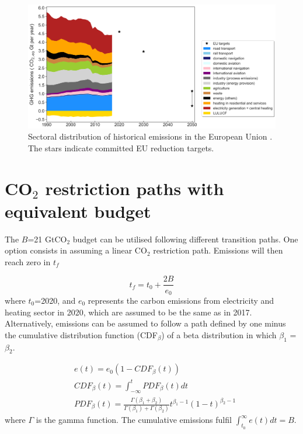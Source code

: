 \documentclass[3p]{elsarticle} %
\begin{document}
\begin{figure}[!h]
\centering
\includegraphics[width=\textwidth]{figures/historical_sectoral_emissions.png}
\caption{Sectoral distribution of historical emissions in the European Union \cite{UNFCCC_inventory}. The stars indicate committed EU reduction targets.} \label{fig_historical_emissions} 
\end{figure}

\section{CO$_2$ restriction paths with equivalent budget}

The $B$=21 GtCO$_2$ budget can be utilised following different transition paths. One option consists in assuming a linear CO$_2$ restriction path. Emissions will then reach zero in $t_f$

\begin{equation}
	t_f=t_0+\frac{2B}{e_0}
\end{equation}
where $t_0$=2020, and $e_0$ represents the carbon emissions from electricity and heating sector in 2020, which are assumed to be the same as in 2017. \\

Alternatively, emissions can be assumed to follow a path defined by one minus the cumulative distribution function (CDF$_\beta$) of a beta distribution in which $\beta_1$ = $\beta_2$. 

\begin{equation}
\begin{aligned}
&	e (t) = e_0(1- CDF_{\beta}(t)) \\
&	CDF_{\beta} (t) =\int_{-\infty}^{t} PDF_{\beta}(t) dt \\
&	PDF_{\beta} (t) =  \frac{\Gamma(\beta_1+\beta_2)}{\Gamma(\beta_1)+\Gamma(\beta_2)} t^{\beta_1-1} (1-t)^{\beta_2-1}
\end{aligned}
\end{equation}
where $\Gamma$ is the gamma function. The cumulative emissions fulfil $\int_{t_0}^{\infty} e(t) dt =B$. \\
\end{document}
